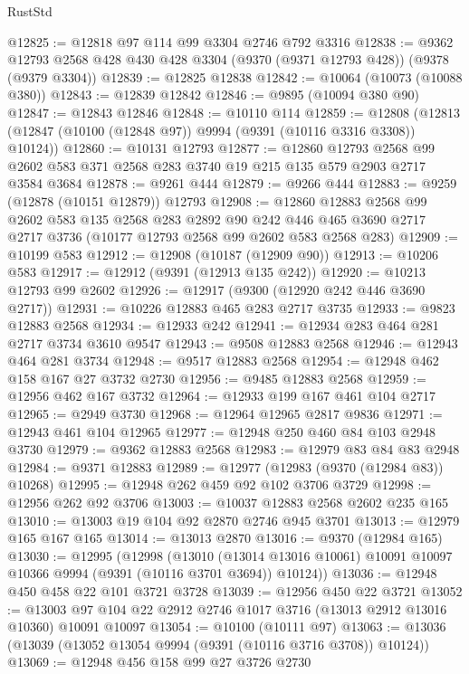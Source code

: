 \begin{lexlean}{RustStd}
\begin{coremodule}
@12825 := @12818 @97 @114 @99 @3304 @2746 @792 @3316
@12838 := @9362 @12793 @2568 @428 @430 @428 @3304 (@9370 (@9371 @12793 @428)) (@9378 (@9379 @3304))
@12839 := @12825 @12838
@12842 := @10064 (@10073 (@10088 @380))
@12843 := @12839 @12842
@12846 := @9895 (@10094 @380 @90)
@12847 := @12843 @12846
@12848 := @10110 @114
@12859 := @12808 (@12813 (@12847 (@10100 (@12848 @97)) @9994 (@9391 (@10116 @3316 @3308)) @10124))
@12860 := @10131 @12793
@12877 := @12860
    @12793
    @2568
    @99
    @2602
    @583
    @371
    @2568
    @283
    @3740
    @19
    @215
    @135
    @579
    @2903
    @2717
    @3584
    @3684
@12878 := @9261 @444
@12879 := @9266 @444
@12883 := @9259 (@12878 (@10151 @12879)) @12793
@12908 := @12860
    @12883
    @2568
    @99
    @2602
    @583
    @135
    @2568
    @283
    @2892
    @90
    @242
    @446
    @465
    @3690
    @2717
    @2717
    @3736
    (@10177 @12793 @2568 @99 @2602 @583 @2568 @283)
@12909 := @10199 @583
@12912 := @12908 (@10187 (@12909 @90))
@12913 := @10206 @583
@12917 := @12912 (@9391 (@12913 @135 @242))
@12920 := @10213 @12793 @99 @2602
@12926 := @12917 (@9300 (@12920 @242 @446 @3690 @2717))
@12931 := @10226 @12883 @465 @283 @2717 @3735
@12933 := @9823 @12883 @2568
@12934 := @12933 @242
@12941 := @12934 @283 @464 @281 @2717 @3734 @3610 @9547
@12943 := @9508 @12883 @2568
@12946 := @12943 @464 @281 @3734
@12948 := @9517 @12883 @2568
@12954 := @12948 @462 @158 @167 @27 @3732 @2730
@12956 := @9485 @12883 @2568
@12959 := @12956 @462 @167 @3732
@12964 := @12933 @199 @167 @461 @104 @2717
@12965 := @2949 @3730
@12968 := @12964 @12965 @2817 @9836
@12971 := @12943 @461 @104 @12965
@12977 := @12948 @250 @460 @84 @103 @2948 @3730
@12979 := @9362 @12883 @2568
@12983 := @12979 @83 @84 @83 @2948
@12984 := @9371 @12883
@12989 := @12977 (@12983 (@9370 (@12984 @83)) @10268)
@12995 := @12948 @262 @459 @92 @102 @3706 @3729
@12998 := @12956 @262 @92 @3706
@13003 := @10037 @12883 @2568 @2602 @235 @165
@13010 := @13003 @19 @104 @92 @2870 @2746 @945 @3701
@13013 := @12979 @165 @167 @165
@13014 := @13013 @2870
@13016 := @9370 (@12984 @165)
@13030 := @12995
    (@12998
      (@13010
        (@13014 @13016 @10061)
        @10091
        @10097
        @10366
        @9994
        (@9391 (@10116 @3701 @3694))
        @10124))
@13036 := @12948 @450 @458 @22 @101 @3721 @3728
@13039 := @12956 @450 @22 @3721
@13052 := @13003 @97 @104 @22 @2912 @2746 @1017 @3716 (@13013 @2912 @13016 @10360) @10091 @10097
@13054 := @10100 (@10111 @97)
@13063 := @13036 (@13039 (@13052 @13054 @9994 (@9391 (@10116 @3716 @3708)) @10124))
@13069 := @12948 @456 @158 @99 @27 @3726 @2730

\end{coremodule}
\end{lexlean}
